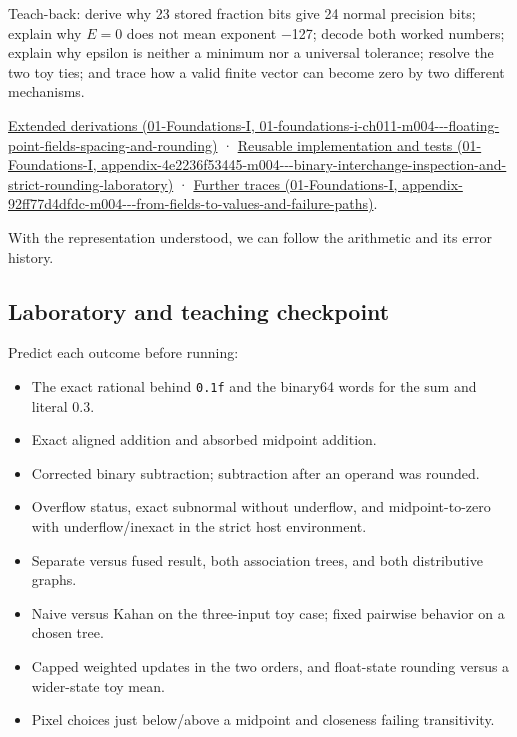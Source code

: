 Teach-back: derive why 23 stored fraction bits give 24 normal precision bits; explain why \(E=0\) does not mean exponent −127; decode both worked numbers; explain why epsilon is neither a minimum nor a universal tolerance; resolve the two toy ties; and trace how a valid finite vector can become zero by two different mechanisms.

\href{../01-Foundations-I/main.pdf\#nameddest=01-foundations-i-ch011-m004---floating-point-fields-spacing-and-rounding}{Extended derivations (01-Foundations-I, 01-foundations-i-ch011-m004-\/-\/-floating-point-fields-spacing-and-rounding)} · \href{../01-Foundations-I/main.pdf\#nameddest=appendix-4e2236f53445-m004---binary-interchange-inspection-and-strict-rounding-laboratory}{Reusable implementation and tests (01-Foundations-I, appendix-4e2236f53445-m004-\/-\/-binary-interchange-inspection-and-strict-rounding-laboratory)} · \href{../01-Foundations-I/main.pdf\#nameddest=appendix-92ff77d4dfdc-m004---from-fields-to-values-and-failure-paths}{Further traces (01-Foundations-I, appendix-92ff77d4dfdc-m004-\/-\/-from-fields-to-values-and-failure-paths)}.

With the representation understood, we can follow the arithmetic and its error history.

\subsection{Laboratory and teaching checkpoint}\label{05-engine-i-ch001-laboratory-and-teaching-checkpoint}

Predict each outcome before running:

\begin{itemize}
\tightlist
\item
  The exact rational behind \texttt{0.1f} and the binary64 words for the sum and literal 0.3.
\item
  Exact aligned addition and absorbed midpoint addition.
\item
  Corrected binary subtraction; subtraction after an operand was rounded.
\item
  Overflow status, exact subnormal without underflow, and midpoint-to-zero with underflow/inexact in the strict host environment.
\item
  Separate versus fused result, both association trees, and both distributive graphs.
\item
  Naive versus Kahan on the three-input toy case; fixed pairwise behavior on a chosen tree.
\item
  Capped weighted updates in the two orders, and float-state rounding versus a wider-state toy mean.
\item
  Pixel choices just below/above a midpoint and closeness failing transitivity.
\end{itemize}


